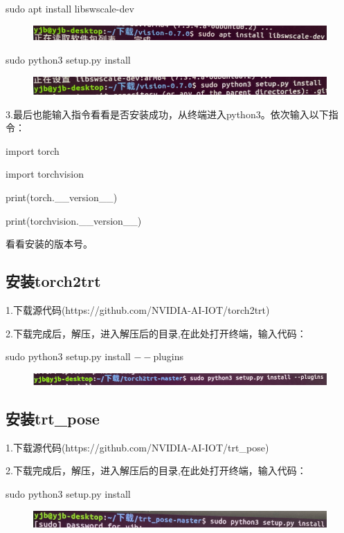 \documentclass[openbib]{article}
\begin{document}
sudo apt install libswscale-dev
\begin{figure}[H]
	\centering
	\includegraphics[scale=0.3]{d9}
\end{figure}

sudo python3 setup.py install
\begin{figure}[H]
	\centering
	\includegraphics[scale=0.3]{d10}
\end{figure}

3.最后也能输入指令看看是否安装成功，从终端进入python3。依次输入以下指令：

import torch

import torchvision

print(torch.\_\_version\_\_)

print(torchvision.\_\_version\_\_)

看看安装的版本号。

\subsection{安装torch2trt}
1.下载源代码(https://github.com/NVIDIA-AI-IOT/torch2trt)

2.下载完成后，解压，进入解压后的目录,在此处打开终端，输入代码：

sudo python3 setup.py install $--$plugins
\begin{figure}[H]
	\centering
	\includegraphics[scale=0.3]{d11}
\end{figure}

\subsection{安装trt\_pose}
1.下载源代码(https://github.com/NVIDIA-AI-IOT/trt\_pose)

2.下载完成后，解压，进入解压后的目录,在此处打开终端，输入代码：

sudo python3 setup.py install 
\begin{figure}[H]
	\centering
	\includegraphics[scale=0.3]{d12}
\end{figure}
\end{document}
